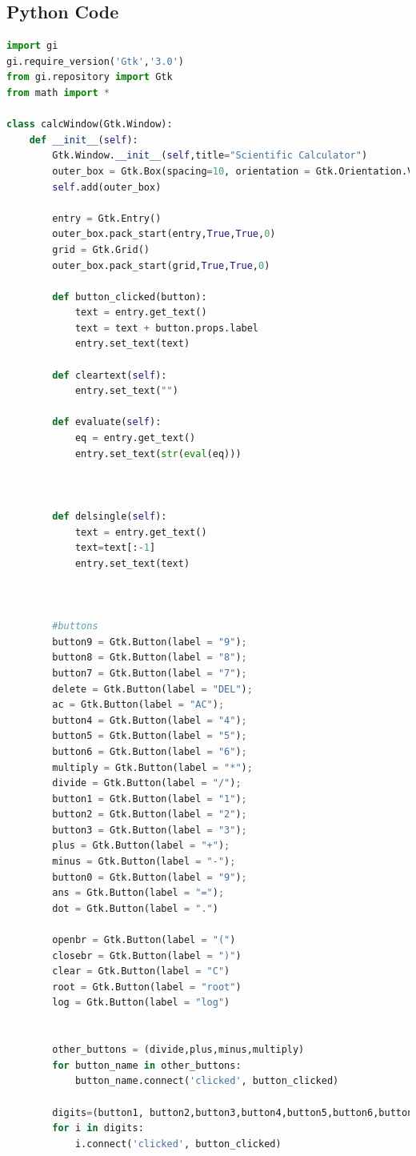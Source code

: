 \documentclass{article}
\begin{document}
 \subsection{Python Code}
 \begin{lstlisting}[language=python]
import gi
gi.require_version('Gtk','3.0')
from gi.repository import Gtk
from math import *

class calcWindow(Gtk.Window):
	def __init__(self):
		Gtk.Window.__init__(self,title="Scientific Calculator")
		outer_box = Gtk.Box(spacing=10, orientation = Gtk.Orientation.VERTICAL)
		self.add(outer_box)

		entry = Gtk.Entry()
		outer_box.pack_start(entry,True,True,0)
		grid = Gtk.Grid()
		outer_box.pack_start(grid,True,True,0)

		def button_clicked(button):
			text = entry.get_text()
			text = text + button.props.label
			entry.set_text(text)
		
		def cleartext(self):
			entry.set_text("")

		def evaluate(self):
			eq = entry.get_text()
			entry.set_text(str(eval(eq)))

		

		def delsingle(self):
			text = entry.get_text()
			text=text[:-1]
			entry.set_text(text)



		#buttons
		button9 = Gtk.Button(label = "9");
		button8 = Gtk.Button(label = "8");
		button7 = Gtk.Button(label = "7");
		delete = Gtk.Button(label = "DEL");
		ac = Gtk.Button(label = "AC");
		button4 = Gtk.Button(label = "4");
		button5 = Gtk.Button(label = "5");
		button6 = Gtk.Button(label = "6");
		multiply = Gtk.Button(label = "*");
		divide = Gtk.Button(label = "/");
		button1 = Gtk.Button(label = "1");
		button2 = Gtk.Button(label = "2");
		button3 = Gtk.Button(label = "3");
		plus = Gtk.Button(label = "+");
		minus = Gtk.Button(label = "-");
		button0 = Gtk.Button(label = "9");
		ans = Gtk.Button(label = "=");
		dot = Gtk.Button(label = ".")

		openbr = Gtk.Button(label = "(")
		closebr = Gtk.Button(label = ")")
		clear = Gtk.Button(label = "C")
		root = Gtk.Button(label = "root")
		log = Gtk.Button(label = "log")


		other_buttons = (divide,plus,minus,multiply)
		for button_name in other_buttons:
			button_name.connect('clicked', button_clicked)

		digits=(button1, button2,button3,button4,button5,button6,button7,button8,button9,button0,openbr,closebr)
		for i in digits:
			i.connect('clicked', button_clicked)


\end{lstlisting}
\end{document}
